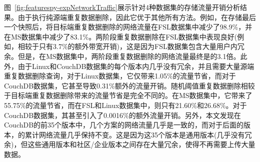 图~\ref{fig:featurespy-expNetworkTraffic}展示针对4种数据集的存储流量开销分析结果。由于\prototype 执行纯源端重复数据删除，因此它优于其他所有方法。例如，在存储最后一个快照后，\prototype 将目标端重复数据删除的网络流量在FSL数据集中减少了98.9\%，并在MS数据集中减少了83.1\%。两阶段重复数据删除在FSL数据集中表现良好(例如，相较于\prototype 只有3.7\%的额外带宽开销)，这是因为FSL数据集包含大量用户内冗余。但是，在MS数据集中，两阶段重复数据删除的网络流量最终是\prototype 的3.1倍。此外，由于Linux和CouchDB数据集的每个版本内几乎没有冗余，并且需要大量源端重复数据删除查询，对于Linux数据集，它仅带来1.05\%的流量节省，而对于CouchDB数据集，它甚至导致0.31\%额外的流量开销。随机阈值重复数据删除相较于目标端重复数据删除带来的流量节省是完全不同的。在MS数据集中，它带来了55.75\%的流量节省，而在FSL和Linux数据集中，则只有21.60\%和26.68\%。对于CouchDB数据集，其甚至引入了0.0016\%的额外流量开销。另外，本文发现在CouchDB的前35个版本中，几个方案的网络流量几乎是一致的，而对于后面的版本，\prototype 的累计网络流量几乎保持不变。这是因为这35个版本是通用版本(几乎没有冗余)，但这些通用版本和社区/企业版本之间存在大量冗余，使得\prototype 不再需要上传大量数据。
